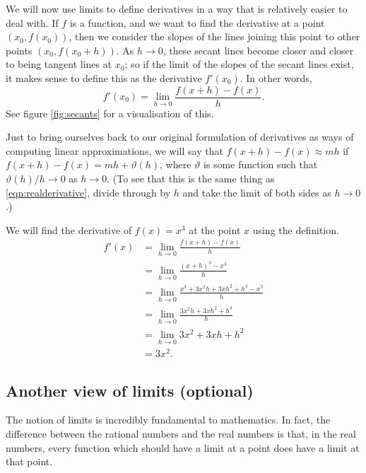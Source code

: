 We will now use limits to define derivatives in a way that is relatively easier to deal with. If $ f $ is a function,
and we want to find the derivative at a point $ (x_0, f(x_0)) $, then we consider the slopes of the lines joining
this point to other points $ (x_0, f(x_0 + h)) $. As $ h \to 0 $, these secant lines become closer and closer to being
tangent lines at $ x_0 $; so if the limit of the slopes of the secant lines exist, it makes sense to define this as
the derivative $ f'(x_0) $. In other words,
\begin{equation}\label{eqn:realderivative}
  f'(x_0) = \lim_{h \to 0} \frac{f(x + h) - f(x)}{h}.
\end{equation}
See figure \ref{fig:secants} for a visualisation of this.

Just to bring ourselves back to our original formulation of derivatives as ways of computing linear
approximations, we will say that $ f(x + h) - f(x) \approx mh $ if $ f(x + h) - f(x) = mh + \vartheta(h) $,
where $ \vartheta $ is some function such that $ \vartheta(h)/h \to 0 $ as $ h \to 0 $. (To see that
this is the same thing as \ref{eqn:realderivative}, divide through by $ h $ and take the limit of both
sides as $ h \to 0 $.)

\begin{ex}
  We will find the derivative of $ f(x) = x^3 $ at the point $ x $ using the definition.
  \begin{align*}
    f'(x) &= \lim_{h \to 0} \frac{f(x + h) - f(x)}{h}\\
          &= \lim_{h \to 0} \frac{(x + h)^3 - x^3}{h}\\
          &= \lim_{h \to 0} \frac{x^3 + 3x^2h + 3xh^2 + h^3 - x^3}{h}\\
          &= \lim_{h \to 0} \frac{3x^2 h + 3xh^2 + h^3}{h}\\
          &= \lim_{h \to 0} 3x^2 + 3xh + h^2\\
          &= 3x^2.
  \end{align*}
\end{ex}

\subsection{Another view of limits (optional)}
The notion of limits is incredibly fundamental to mathematics. In fact, the difference between the rational numbers and the real
numbers is that, in the real numbers, every function which should have a limit at a point does have a limit at that point.

